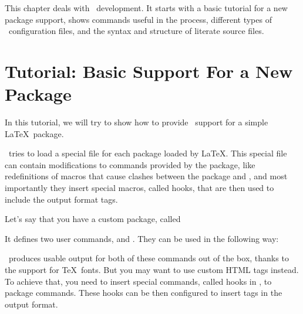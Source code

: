 
This chapter deals with \texfourht\ development. It starts with a basic
tutorial for a new package support, shows commands useful in the process,
different types of \texfourht\ configuration files, and the syntax and structure of 
literate source files.

\section{Tutorial: Basic Support For a New Package}

In this tutorial, we will try to show how to provide \texfourht\ support for a
simple \LaTeX\ package. 

\texfourht\ tries to load a special  file for each package loaded
by \LaTeX. This special file can contain modifications to commands provided by the package, like 
redefinitions of macros that cause clashes between the package and \texfourht, and most importantly
they insert special macros, called hooks, that are then used to include the output format tags.

Let's say that you have a custom package, called 


It defines two user commands,  and . 
They can be used in the following way:



\texfourht\ produces usable output for both of these commands out of the box, 
thanks to the support for \TeX\ fonts. But you may want to use custom HTML 
tags instead. To achieve that, you need to insert special commands, called hooks 
in \texfourht, to package commands. These hooks can be then configured to
insert tags in the output format.


